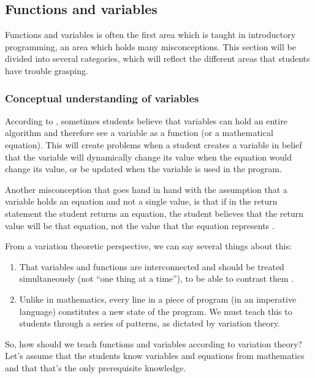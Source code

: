 \subsection{Functions and variables}

Functions and variables is often the first area which is taught in 
introductory programming, an area which holds many misconceptions. This 
section will be divided into several categories, which will reflect the 
different areas that students have trouble grasping.  

\subsubsection{Conceptual understanding of variables}

According to \textcite{
Kohn2017VariableEvaluation,Plass2015Variables,Doukakis2007}, 
sometimes students believe that variables can hold an entire algorithm and 
therefore see a variable as a function (or a mathematical equation).
This will create problems when a student creates a variable in belief that the 
variable will dynamically change its value when the equation would change its 
value, or be updated when the variable is used in the program.

Another misconception that goes hand in hand with the assumption that a 
variable holds an equation and not a single value, is that if in the return 
statement the student returns an equation, the student believes that the return 
value will be that equation, not the value that the equation represents 
\parencite{Kohn2017VariableEvaluation}.

From a variation theoretic perspective, we can say several things about 
this:
\begin{enumerate}
  \item That variables and functions are interconnected and should be treated 
    simultaneously (not \enquote{one thing at a time}), to be able to contrast 
    them \parencite[\cf][Ch~6, pp~167--168]{NCOL}.
  \item Unlike in mathematics, every line in a piece of program (in an 
    imperative language) constitutes a new state of the program.
    We must teach this to students through a series of patterns, as dictated by 
    variation theory.
\end{enumerate}

So, how should we teach functions and variables according to variation theory?
Let's assume that the students know variables and equations from mathematics 
and that that's the only prerequisite knowledge.

